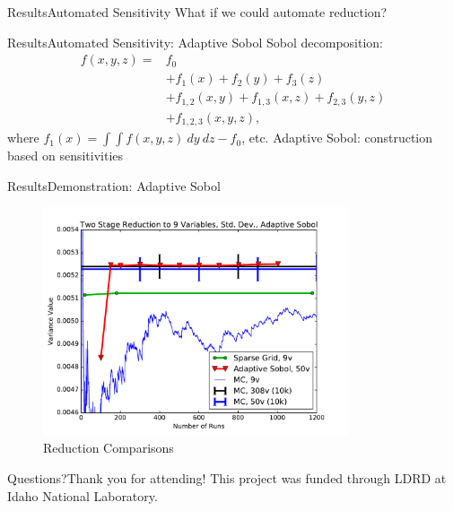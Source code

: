 \documentclass{beamer}
\begin{document}
\begin{frame}{Results}{Automated Sensitivity}
\vfill
What if we could automate reduction?
\vfill
\end{frame}

\begin{frame}{Results}{Automated Sensitivity: Adaptive Sobol}
  \vfill
  Sobol decomposition:
  \begin{align*}
    f(x,y,z) =& f_0 \\
             &+ f_1(x) + f_2(y) + f_3(z)\\
             &+ f_{1,2}(x,y) + f_{1,3}(x,z) + f_{2,3}(y,z) \\
             &+ f_{1,2,3}(x,y,z),
  \end{align*}
  where $f_1(x)=\int\int f(x,y,z)\ dy\ dz - f_0$, etc.
  \vfill
  Adaptive Sobol: construction based on sensitivities
  \vfill
\end{frame}

\begin{frame}{Results}{Demonstration: Adaptive Sobol}
  \begin{figure}[h]
    \includegraphics[width=0.8\textwidth]{graphics/mc_vs_sc_var_adsob}
    \caption{Reduction Comparisons}
    \label{adsob}
  \end{figure}
\end{frame}


\begin{frame}{Questions?}{Thank you for attending!}
  \vfill
  \small
  This project was funded through LDRD at Idaho National Laboratory.
  \vfill
\end{frame}
\end{document}
